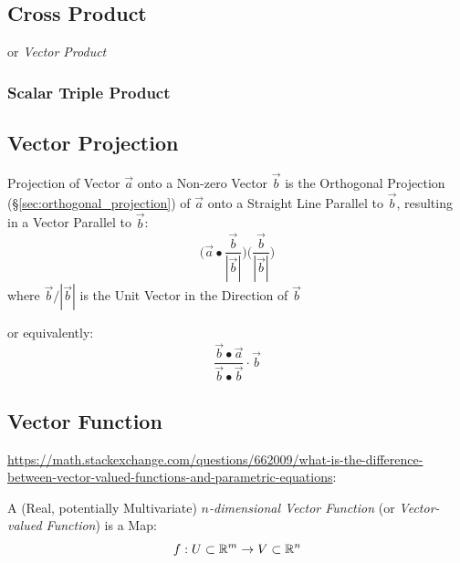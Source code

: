 {\subsection{Cross Product}\label{sec:cross_product}

or \emph{Vector Product}



\subsubsection{Scalar Triple Product}\label{sec:scalar_triple_product}



\subsection{Vector Projection}\label{sec:vector_projection}

Projection of Vector $\vec{a}$ onto a Non-zero Vector $\vec{b}$ is the
Orthogonal Projection (\S\ref{sec:orthogonal_projection}) of $\vec{a}$ onto a
Straight Line Parallel to $\vec{b}$, resulting in a Vector Parallel to
$\vec{b}$:
\[
  \big(\vec{a} \bullet \frac{\vec{b}}{|\vec{b}|}\big)
  \big(\frac{\vec{b}}{|\vec{b}|}\big)
\]
where $\vec{b}/|\vec{b}|$ is the Unit Vector in the Direction of $\vec{b}$

or equivalently:
\[
\frac{\vec{b} \bullet \vec{a}}
  {\vec{b} \bullet \vec{b}} \cdot \vec{b}
\]



\subsection{Vector Function}\label{sec:vector_function}

\url{https://math.stackexchange.com/questions/662009/what-is-the-difference-between-vector-valued-functions-and-parametric-equations}:

A (Real, potentially Multivariate) \emph{$n$-dimensional Vector Function} (or
\emph{Vector-valued Function}) is a Map:
\[
  f : U \subset \mathbb{R}^m \rightarrow V \subset \mathbb{R}^n
\]

}
